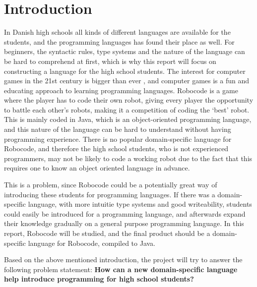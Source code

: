 \chapter{Introduction}

In Danish high schools all kinds of different languages are available for the students, and the programming languages has found their place as well. For beginners, the syntactic rules, type systems and the nature of the language can be hard to comprehend at first, which is why this report will focus on constructing a language for the high school students. The interest for computer games in the 21st century is bigger than ever \citep{Wankel}, and computer games is a fun and educating approach to learning programming languages. Robocode is a game where the player has to code their own robot, giving every player the opportunity to battle each other’s robots, making it a competition of coding the ‘best’ robot. This is mainly coded in Java, which is an object-oriented programming language, and this nature of the language can be hard to understand without having programming experience. There is no popular domain-specific language for Robocode, and therefore the high school students, who is not experienced programmers, may not be likely to code a working robot due to the fact that this requires one to know an object oriented language in advance. 

This is a problem, since Robocode could be a potentially great way of introducing these students for programming languages. If there was a domain-specific language, with more intuitie type systems and good writeability, students could easily be introduced for a programming language, and afterwards expand their knowledge gradually on a general purpose programming language. In this report, Robocode will be studied, and the final product should be a domain-specific language for Robocode, compiled to Java.
	
Based on the above mentioned introduction, the project will try to answer the following problem statement: 
\textbf{How can a new domain-specific language help introduce programming for high school students?} 